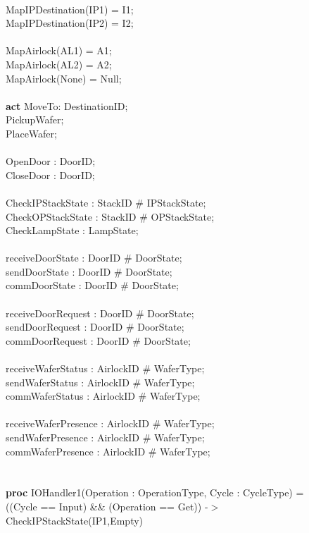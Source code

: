 \documentclass[a4paper,12pt]{article}
\begin{document}
\\		MapIPDestination(IP1) = I1;
\\		MapIPDestination(IP2) = I2;
\\
\\		MapAirlock(AL1) = A1;
\\		MapAirlock(AL2) = A2;
\\		MapAirlock(None) = Null;
\\
\\\textbf{act} MoveTo: DestinationID;
\\	  PickupWafer;
\\	  PlaceWafer;
\\
\\	    OpenDoor : DoorID;
\\		CloseDoor : DoorID;
\\
\\	  CheckIPStackState : StackID \# IPStackState;
\\	  CheckOPStackState : StackID \# OPStackState;
\\		CheckLampState : LampState;
\\
\\	  receiveDoorState : DoorID \# DoorState;
\\	  sendDoorState : DoorID \# DoorState;
\\		commDoorState : DoorID \# DoorState;
\\
\\	  receiveDoorRequest : DoorID \# DoorState;
\\		sendDoorRequest : DoorID \# DoorState;
\\		commDoorRequest : DoorID \# DoorState;
\\
\\	  receiveWaferStatus : AirlockID \# WaferType;
\\		sendWaferStatus : AirlockID \# WaferType;
\\		commWaferStatus : AirlockID \# WaferType;
\\
\\	  receiveWaferPresence : AirlockID \# WaferType;
\\		sendWaferPresence : AirlockID \# WaferType;
\\		commWaferPresence : AirlockID \# WaferType;
\\
\\
\\\textbf{proc} IOHandler1(Operation : OperationType, Cycle : CycleType) = 
\\((Cycle == Input) \&\& (Operation == Get)) -$>$ CheckIPStackState(IP1,Empty)
\end{document}
